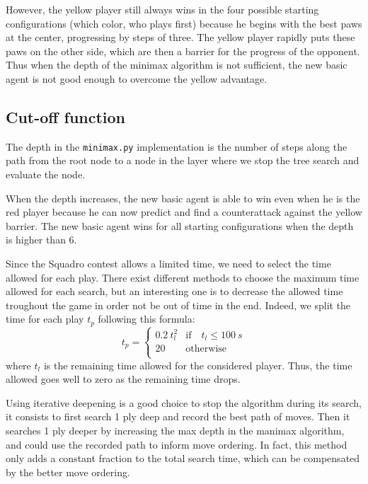 \documentclass[en]{article}
\newcommand{\py}[1]{\texttt{#1}}
\begin{document}
However, the yellow player still always wins in the four possible starting configurations (which color, who plays first) because he begins with the best paws at the center, progressing by steps of three. The yellow player rapidly puts these paws on the other side, which are then a barrier for the progress of the opponent.
Thus when the depth of the minimax algorithm is not sufficient, the new basic agent is not good enough to overcome the yellow advantage.

\subsection{Cut-off function}

The depth in the \py{minimax.py} implementation is the number of steps along the path from the root node to a node in the layer where we stop the tree search and evaluate the node.

When the depth increases, the new basic agent is able to win even when he is the red player because he can now predict and find a counterattack against the yellow barrier. The new basic agent wins for all starting configurations when the depth is higher than 6.

Since the Squadro contest allows a limited time, we need to select the time allowed for each play.
There exist different methods to choose the maximum time allowed for each search, but an interesting one is to decrease the allowed time troughout the game in order not be out of time in the end. Indeed, we split the time for each play $t_{p}$ following this formula:
\[
    t_{p} = 
    \left\{
    \begin{array}{ll}
      0.2 \: t_{l}^2 & \mathrm{if}\quad t_{l}\leq \SI{100}{s} \\
      20 & \mathrm{otherwise} \\
    \end{array} 
    \right.
\]
where $t_l$ is the remaining time allowed for the considered player. Thus, the time allowed goes well to zero as the remaining time drops.

Using iterative deepening is a good choice to stop the algorithm during its search, it consists to first search 1 ply deep and record the best path of moves. Then it searches 1 ply deeper by increasing the max depth in the manimax algorithm, and could use the recorded path to inform move ordering. In fact, this method only adds a constant fraction to the total search time, which can be compensated by the better move ordering.
\end{document}
